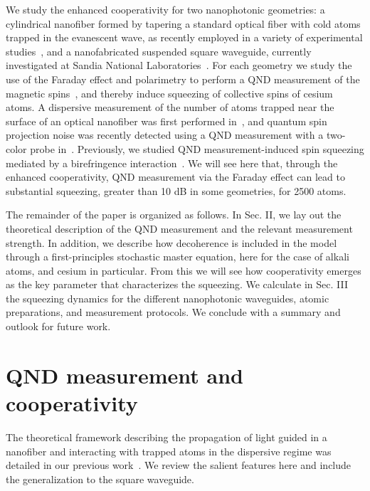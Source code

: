 \documentclass[preprint,aps,pra,onecolumn,superscriptaddress]{revtex4-1} %
\begin{document}
We study the enhanced cooperativity for two nanophotonic geometries: a cylindrical nanofiber formed by tapering a standard optical fiber with cold atoms trapped in the evanescent wave, as recently employed in a variety of experimental studies~\cite{Vetsch2010Optical, Goban2012, Reitz2013, Lee2015, Goban2014, Reitz2014, Volz2014Nonlinear, Beguin2014, Mitsch2014,Kato2015Strong, Sayrin2015, Sayrin2015a, Mitsch2014a, Solano2017Dynamics, Beguin2017Observation}, and a nanofabricated suspended square waveguide, currently investigated at Sandia National Laboratories~\cite{Lee2017Characterizations}.  For each geometry we study the use of the Faraday effect and polarimetry to perform a QND measurement of the magnetic spins~\cite{Smith2003a}, and thereby induce squeezing of collective spins of cesium atoms.  A dispersive measurement of the number of atoms trapped near the surface of an optical nanofiber was first performed in~\cite{Dawkins2011}, and quantum spin projection noise was recently detected using a QND measurement with a two-color probe in~\cite{Beguin2014, Beguin2017Observation}.  Previously, we studied QND measurement-induced spin squeezing  mediated by a birefringence interaction~\cite{Qi2016}. We will see here that, through the enhanced cooperativity, QND measurement via the Faraday effect can lead to substantial squeezing, greater than 10 dB in some geometries, for 2500 atoms.

The remainder of the paper is organized as follows.  In Sec. II, we lay out the theoretical description of the QND measurement and the relevant measurement strength.  In addition, we describe how decoherence is included in the model through a first-principles stochastic master equation, here for the case of alkali atoms, and cesium in particular.  From this we will see how cooperativity emerges as the key parameter that characterizes the squeezing.  We calculate in Sec. III the squeezing dynamics for the different nanophotonic waveguides, atomic preparations, and measurement protocols.  We conclude with a summary and outlook for future work.


\section{QND measurement and cooperativity} \label{Sec::QNDandCooperativityTheory}
The theoretical framework describing the propagation of light guided in a nanofiber and interacting with trapped atoms in the dispersive regime was detailed in our previous work~\cite{Qi2016}.  We review the salient features here and include the generalization to the square waveguide.
\end{document}
